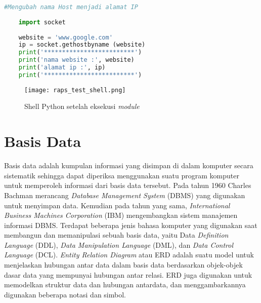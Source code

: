     
    \begin{lstlisting}[language=Python, caption=rasp\_test.py,label=Test Pyhton Rapsberry]
    #Mengubah nama Host menjadi alamat IP
    
    import socket
    
    website = 'www.google.com'
    ip = socket.gethostbyname (website)
    print('*************************')
    print('nama website :', website)
    print('alamat ip :', ip)
    print('*************************')
    \end{lstlisting}
    
    \begin{figure}[H]
    	\centering  
    	\texttt{[image: raps\_test\_shell.png]}  
    	\caption[Shell python setelah eksekusi \textit{module}]{Shell Python setelah eksekusi \textit{module}} 
    	\label{fig:Shell Python setelah eksekusi module} 
    \end{figure}

\section{Basis Data}
Basis  data  adalah  kumpulan  informasi  yang  disimpan  di dalam  komputer  secara  sistematik  sehingga  dapat  diperiksa menggunakan  suatu  program  komputer  untuk  memperoleh informasi dari basis data tersebut. Pada tahun 1960 Charles Bachman merancang \textit{Database Management System} (DBMS) yang digunakan untuk menyimpan data. Kemudian pada tahun yang sama, \textit{International Business Machines   Corporation} (IBM)  mengembangkan  sistem  manajemen  informasi DBMS. Terdapat  beberapa  jenis  bahasa  komputer  yang  digunakan  saat membangun  dan  memanipulasi  sebuah  basis  data,  yaitu Data \textit{Definition  Language} (DDL), \textit{Data  Manipulation  Language} (DML), dan \textit{Data Control Language} (DCL).
\textit{Entity   Relation   Diagram} atau   ERD   adalah   suatu model  untuk  menjelaskan  hubungan  antar  data  dalam basis   data   berdasarkan   objek-objek   dasar   data   yang mempunyai hubungan antar relasi. ERD juga digunakan untuk  memodelkan  struktur  data  dan  hubungan  antardata, dan menggambarkannya digunakan beberapa notasi dan simbol. 
    





